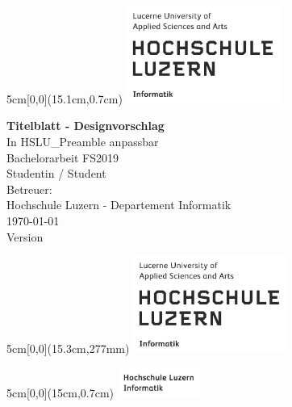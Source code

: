 \begin{titlepage}
	\begin{textblock*}{5cm}[0,0](15.1cm,0.7cm)
		\includegraphics[keepaspectratio,width=5cm]{img/HSLU_Logo}
	\end{textblock*}
	\begin{center}
		\vspace*{5cm}
		\Huge{\textbf{Titelblatt - Designvorschlag}} \\
		\Large{In HSLU\_Preamble anpassbar}\\
		\vspace{0.5em}
		\Large{Bachelorarbeit FS2019}\\
		\vspace{3em}
		\LARGE{Studentin / Student}\\
		\vspace{1em}
		\Large{Betreuer: }\\
		\vfill
		\large{Hochschule Luzern - Departement Informatik}\\
		\large{\today}\\
		\large{Version \docversion}
	\end{center}
	\begin{textblock*}{5cm}[0,0](15.3cm,277mm)
		\includegraphics[keepaspectratio,width=5cm]{img/HSLU_Logo}
	\end{textblock*}
\end{titlepage}

\newpage


\begin{textblock*}{5cm}[0,0](15cm,0.7cm)
	\includegraphics[keepaspectratio,width=2.7cm]{img/HSLU_Logo_Header}
\end{textblock*}

